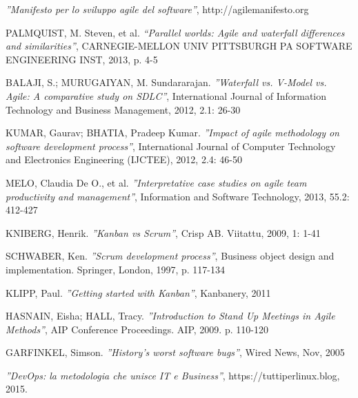 \documentclass[a4paper, 12pt]{report}
\numberwithin{equation}{section}
\begin{document}
\begin{thebibliography}{9}
            \emph{''Manifesto per lo sviluppo agile del software''},
        http://agilemanifesto.org
        
        PALMQUIST, M. Steven, et al.
            \emph{``Parallel worlds: Agile and waterfall differences and similarities''},
          CARNEGIE-MELLON UNIV PITTSBURGH PA SOFTWARE ENGINEERING INST, 2013, p. 4-5
          
          BALAJI, S.; MURUGAIYAN, M. Sundararajan.
            \emph{''Waterfall vs. V-Model vs. Agile: A comparative study on SDLC''},
            International Journal of Information Technology and Business Management, 2012, 2.1: 26-30
            
        KUMAR, Gaurav; BHATIA, Pradeep Kumar.
            \emph{''Impact of agile methodology on software development process''},
            International Journal of Computer Technology and Electronics Engineering (IJCTEE), 2012, 2.4: 46-50
            
        MELO, Claudia De O., et al.
            \emph{''Interpretative case studies on agile team productivity and management''},
            Information and Software Technology, 2013, 55.2: 412-427
            
        KNIBERG, Henrik.
            \emph{''Kanban vs Scrum''},
            Crisp AB. Viitattu, 2009, 1: 1-41
            
        SCHWABER, Ken.
            \emph{''Scrum development process''},
            Business object design and implementation. Springer, London, 1997, p. 117-134
            
        KLIPP, Paul.
            \emph{''Getting started with Kanban''},
            Kanbanery, 2011
            
        HASNAIN, Eisha; HALL, Tracy.
            \emph{''Introduction to Stand Up Meetings in Agile Methods''},
            AIP Conference Proceedings. AIP, 2009. p. 110-120
            
        GARFINKEL, Simson.
            \emph{''History’s worst software bugs''},
            Wired News, Nov, 2005
            
            \emph{''DevOps: la metodologia che unisce IT e Business''},
            https://tuttiperlinux.blog, 2015.
            

\end{thebibliography}
\end{document}
